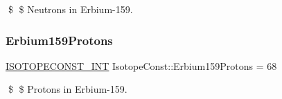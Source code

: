 \$ \$ Neutrons in Erbium-\/159. \mbox{\label{group___isotope_const-_erbium-_er159_gacbd70b00173f4364ced4df270a5563ff}} 
\subsubsection{\texorpdfstring{Erbium159\+Protons}{Erbium159Protons}}
{\footnotesize\ttfamily \mbox{\hyperlink{group___isotope_const-_macros_ga5f18360b3e99483a35c32d789e62621c}{I\+S\+O\+T\+O\+P\+E\+C\+O\+N\+S\+T\+\_\+\+I\+NT}} Isotope\+Const\+::\+Erbium159\+Protons = 68}

\$ \$ Protons in Erbium-\/159. 